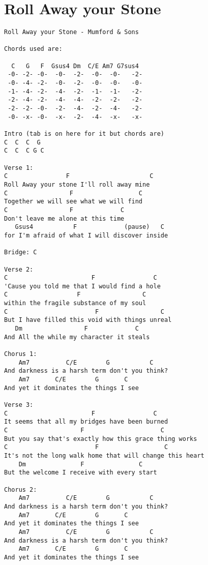 \documentclass[leqno]{memoir}
\begin{document}
\chapter{Roll Away your Stone}
\begin{verbatim}
Roll Away your Stone - Mumford & Sons

Chords used are:

  C   G   F  Gsus4 Dm  C/E Am7 G7sus4
 -0- -2- -0-  -0-  -2-  -0-  -0-   -2-
 -0- -4- -2-  -0-  -2-  -0-  -0-   -0-
 -1- -4- -2-  -4-  -2-  -1-  -1-   -2-
 -2- -4- -2-  -4-  -4-  -2-  -2-   -2-
 -2- -2- -0-  -2-  -4-  -2-  -4-   -2-
 -0- -x- -0-  -x-  -2-  -4-  -x-   -x-

Intro (tab is on here for it but chords are)
C  C  C  G
C  C  C G C

Verse 1:
C                F                      C
Roll Away your stone I'll roll away mine
C                 F                  C
Together we will see what we will find
C                 F             C
Don't leave me alone at this time
   Gsus4           F             (pause)   C
for I'm afraid of what I will discover inside

Bridge: C

Verse 2:
C                       F                C
'Cause you told me that I would find a hole
C                   F                 C
within the fragile substance of my soul
C                        F                 C
But I have filled this void with things unreal
   Dm                 F             C
And All the while my character it steals

Chorus 1:
    Am7          C/E        G           C
And darkness is a harsh term don't you think?
    Am7       C/E        G       C
And yet it dominates the things I see

Verse 3:
C                       F                C
It seems that all my bridges have been burned
C                    F                     C
But you say that's exactly how this grace thing works
C                        F                  C
It's not the long walk home that will change this heart
    Dm               F               C
But the welcome I receive with every start

Chorus 2:
    Am7          C/E        G           C
And darkness is a harsh term don't you think?
    Am7       C/E        G       C
And yet it dominates the things I see
    Am7          C/E        G           C
And darkness is a harsh term don't you think?
    Am7       C/E        G       C
And yet it dominates the things I see


\end{verbatim}
\end{document}
